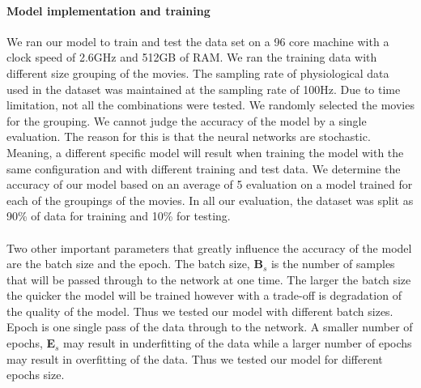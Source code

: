 \paragraph{Model implementation and training} We ran our model to train and test the data set on a 96 core machine with a clock speed of 2.6GHz and 512GB of RAM. We ran the training data with different size grouping of the movies. The sampling rate of physiological data used in the dataset was maintained at the sampling rate of 100Hz. Due to time limitation, not all the combinations were tested. We randomly selected the movies for the grouping. We cannot judge the accuracy of the model by a single evaluation. The reason for this is that the neural networks are stochastic. Meaning, a different specific model will result when training the model with the same configuration and with different training and test data. We determine the accuracy of our model based on an average of 5 evaluation on a model trained for each of the groupings of the movies. In all our evaluation, the dataset was split as 90\% of data for training and 10\% for testing.

\paragraph{} Two other important parameters that greatly influence the accuracy of the model are the batch size and the epoch. The batch size, \textbf{B$_{s}$} is the number of samples that will be passed through to the network at one time. The larger the batch size the quicker the model will be trained however with a trade-off is degradation of the quality of the model. Thus we tested our model with different batch sizes. Epoch is one single pass of the data through to the network. A smaller number of epochs, \textbf{E$_{s}$} may result in underfitting of the data while a larger number of epochs may result in overfitting of the data. Thus we tested our model for different epochs size.

